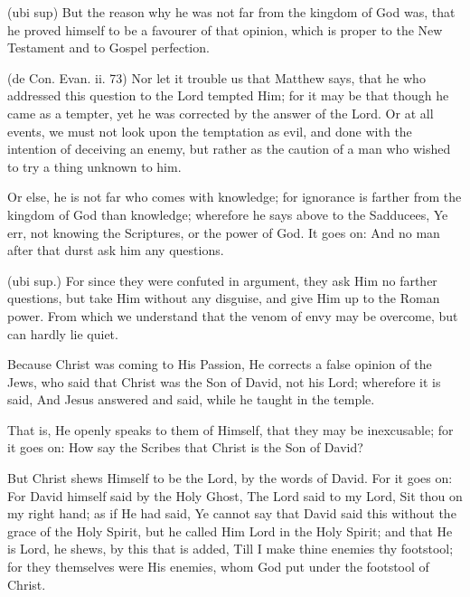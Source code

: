  (ubi sup) But the reason why he was not far from the kingdom of God was, that he proved himself to be a favourer of that opinion, which is proper to the New Testament and to Gospel perfection.

 (de Con. Evan. ii. 73) Nor let it trouble us that Matthew says, that he who addressed this question to the Lord tempted Him; for it may be that though he came as a tempter, yet he was corrected by the answer of the Lord. Or at all events, we must not look upon the temptation as evil, and done with the intention of deceiving an enemy, but rather as the caution of a man who wished to try a thing unknown to him.

 Or else, he is not far who comes with knowledge; for ignorance is farther from the kingdom of God than knowledge; wherefore he says above to the Sadducees, Ye err, not knowing the Scriptures, or the power of God. It goes on: And no man after that durst ask him any questions.

 (ubi sup.) For since they were confuted in argument, they ask Him no farther questions, but take Him without any disguise, and give Him up to the Roman power. From which we understand that the venom of envy may be overcome, but can hardly lie quiet.

 

 Because Christ was coming to His Passion, He corrects a false opinion of the Jews, who said that Christ was the Son of David, not his Lord; wherefore it is said, And Jesus answered and said, while he taught in the temple.

 That is, He openly speaks to them of Himself, that they may be inexcusable; for it goes on: How say the Scribes that Christ is the Son of David?

 But Christ shews Himself to be the Lord, by the words of David. For it goes on: For David himself said by the Holy Ghost, The Lord said to my Lord, Sit thou on my right hand; as if He had said, Ye cannot say that David said this without the grace of the Holy Spirit, but he called Him Lord in the Holy Spirit; and that He is Lord, he shews, by this that is added, Till I make thine enemies thy footstool; for they themselves were His enemies, whom God put under the footstool of Christ.

